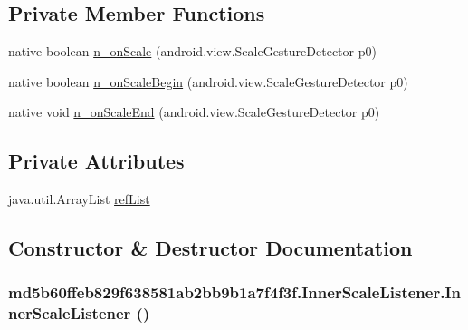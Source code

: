 \subsection*{Private Member Functions}
\begin{CompactItemize}
\item 
native boolean \hyperlink{classmd5b60ffeb829f638581ab2bb9b1a7f4f3f_1_1_inner_scale_listener_91faa282db003e8926259969696d9b9e}{n\_\-onScale} (android.view.ScaleGestureDetector p0)
\item 
native boolean \hyperlink{classmd5b60ffeb829f638581ab2bb9b1a7f4f3f_1_1_inner_scale_listener_b86d54aeb6cce4d552b0d578483a070f}{n\_\-onScaleBegin} (android.view.ScaleGestureDetector p0)
\item 
native void \hyperlink{classmd5b60ffeb829f638581ab2bb9b1a7f4f3f_1_1_inner_scale_listener_43f4b9e4648733eb24555ee18fffa626}{n\_\-onScaleEnd} (android.view.ScaleGestureDetector p0)
\end{CompactItemize}
\subsection*{Private Attributes}
\begin{CompactItemize}
\item 
java.util.ArrayList \hyperlink{classmd5b60ffeb829f638581ab2bb9b1a7f4f3f_1_1_inner_scale_listener_0542c47f216a6c8a1867c887ac1f9cce}{refList}
\end{CompactItemize}


\subsection{Constructor \& Destructor Documentation}
\hypertarget{classmd5b60ffeb829f638581ab2bb9b1a7f4f3f_1_1_inner_scale_listener_12a0b72776e59c364a18348c23d994c1}{
\subsubsection[{InnerScaleListener}]{\setlength{\rightskip}{0pt plus 5cm}md5b60ffeb829f638581ab2bb9b1a7f4f3f.InnerScaleListener.InnerScaleListener ()}}
\label{classmd5b60ffeb829f638581ab2bb9b1a7f4f3f_1_1_inner_scale_listener_12a0b72776e59c364a18348c23d994c1}




